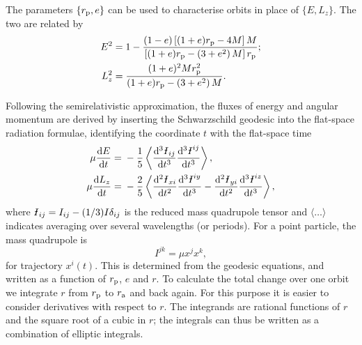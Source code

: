 The parameters $\{r_\mathrm{p},e\}$ can be used to characterise orbits in place of $\{E,L_z\}$. The two are related by
\begin{align}
E^2 = {} & 1 - \frac{(1 - e) \left[(1 + e)r_\mathrm{p} - 4M\right]M}{\left[(1 + e)r_\mathrm{p} - \left(3 + e^2\right)M\right]r_\mathrm{p}}; \\
L_z^2 = {} & \frac{(1 + e)^2 M r_\mathrm{p}^2}{(1 + e)r_\mathrm{p} - \left(3 + e^2\right)M}.
\end{align}

Following the semirelativistic approximation, the fluxes of energy and angular momentum are derived by inserting the Schwarzschild geodesic into the flat-space radiation formulae, identifying the coordinate $t$ with the flat-space time \citep[chapter 36]{Misner1973}
\begin{align}
\mu\diff{E}{t} = {} & -\recip{5}\left\langle \diffn{\Ibar_{ij}}{t}{3}\diffn{\Ibar^{ij}}{t}{3}\right\rangle,\\
\mu\diff{L_z}{t} = {} & -\frac{2}{5}\left\langle\diffn{\Ibar_{xi}}{t}{2}\diffn{\Ibar^{iy}}{t}{3} - \diffn{\Ibar_{yi}}{t}{2}\diffn{\Ibar^{iz}}{t}{3}\right\rangle,
\end{align}
where $\Ibar_{ij} = I_{ij} - (1/3)I\delta_{ij}$ is the reduced mass quadrupole tensor and $\langle\ldots\rangle$ indicates averaging over several wavelengths (or periods). For a point particle, the mass quadrupole is
\begin{equation}
{I}^{jk} = \mu x^j x^k,
\end{equation}
for trajectory $x^i(t)$. This is determined from the geodesic equations, and written as a function of $r_\mathrm{p}$, $e$ and $r$. To calculate the total change over one orbit we integrate $r$ from $r_\mathrm{p}$ to $r_\mathrm{a}$ and back again. For this purpose it is easier to consider derivatives with respect to $r$. The integrands are rational functions of $r$ and the square root of a cubic in $r$; the integrals can thus be written as a combination of elliptic integrals.

